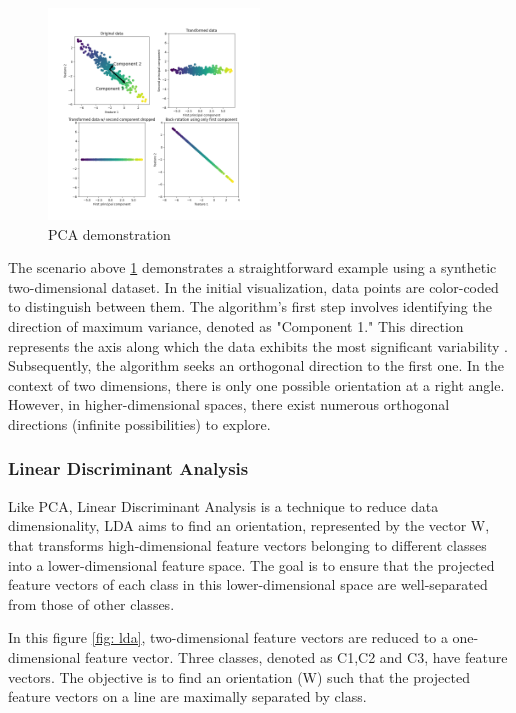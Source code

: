 \documentclass[12pt,a4paper,twocolumn]{article}
\begin{document}
\begin{figure}[H]
\centering
\includegraphics[width=0.5\textwidth]{images2/pca.png}
\caption{\label{fig: pca} PCA demonstration}
\end{figure}
\par The scenario above \ref{fig: pca}  demonstrates a straightforward example using a synthetic two-dimensional dataset. In the initial visualization, data points are color-coded to distinguish between them. The algorithm's first step involves identifying the direction of maximum variance, denoted as "Component 1." This direction represents the axis along which the data exhibits the most significant variability .
Subsequently, the algorithm seeks an orthogonal direction  to the first one. In the context of two dimensions, there is only one possible orientation at a right angle. However, in higher-dimensional spaces, there exist numerous orthogonal directions (infinite possibilities) to explore. 
\cite{pca}
\subsubsection{Linear Discriminant Analysis}
\par Like PCA, Linear Discriminant Analysis is a technique to reduce data dimensionality,
LDA aims to find an orientation, represented by the vector W, that transforms high-dimensional feature vectors belonging to different classes into a lower-dimensional feature space.
The goal is to ensure that the projected feature vectors of each class in this lower-dimensional space are well-separated from those of other classes.
\par  In this figure \ref{fig: lda}, two-dimensional feature vectors are reduced to a one-dimensional feature vector.
Three classes, denoted as C1,C2 and C3, have feature vectors. The objective is to find an orientation (W) such that the projected feature vectors on a line are maximally separated by class.
\end{document}
